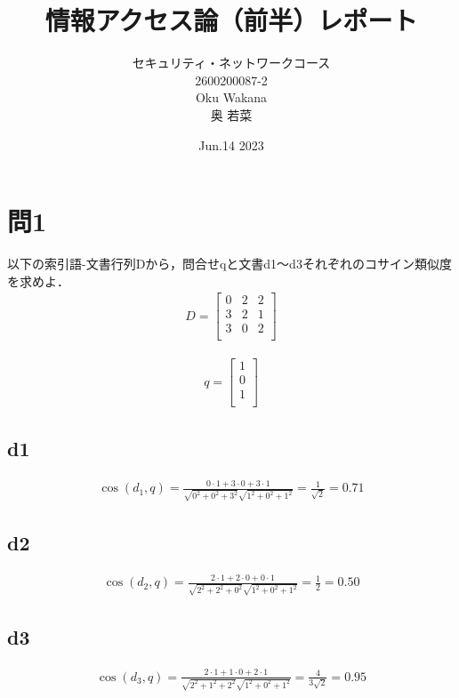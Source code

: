 \documentclass[dvipdfmx,autodetect-engine,titlepage]{jsarticle}
\title{情報アクセス論（前半）レポート\\
}
\author{セキュリティ・ネットワークコース\\2600200087-2\\Oku Wakana\\奥 若菜}
\date{Jun.14 2023}
\begin{document}
\maketitle

\section{問1}
以下の索引語-文書行列Dから，問合せqと文書d1〜d3それぞれのコサイン類似度を求めよ．
\begin{eqnarray}
  D =
  \begin{bmatrix}
    0 & 2 & 2\\
    3 & 2 & 1\\
    3 & 0 & 2\\
  \end{bmatrix}
\end{eqnarray}

\begin{eqnarray}
  q =
  \begin{bmatrix}
    1 \\
    0 \\
    1 \\
  \end{bmatrix}
\end{eqnarray}

\subsection{d1}

\begin{eqnarray}
  \cos (d_{1},q) = \frac{0\cdot 1 + 3\cdot 0 + 3\cdot 1}{\sqrt{0^2+0^2+3^2} \sqrt{1^2+0^2+1^2} } 
  = \frac{1}{\sqrt{2} } 
  = 0.71
\end{eqnarray}

\subsection{d2}

\begin{eqnarray}
  \cos (d_{2},q) = \frac{2\cdot 1 + 2\cdot 0 + 0\cdot 1}{\sqrt{2^2+2^2+0^2} \sqrt{1^2+0^2+1^2} } 
  = \frac{1}{2} 
  = 0.50
\end{eqnarray}

\subsection{d3}

\begin{eqnarray}
  \cos (d_{3},q) = \frac{2\cdot 1 + 1\cdot 0 + 2\cdot 1}{\sqrt{2^2+1^2+2^2} \sqrt{1^2+0^2+1^2} } 
  = \frac{4}{3\sqrt{2} } 
  = 0.95
\end{eqnarray}
　\\
\end{document}
